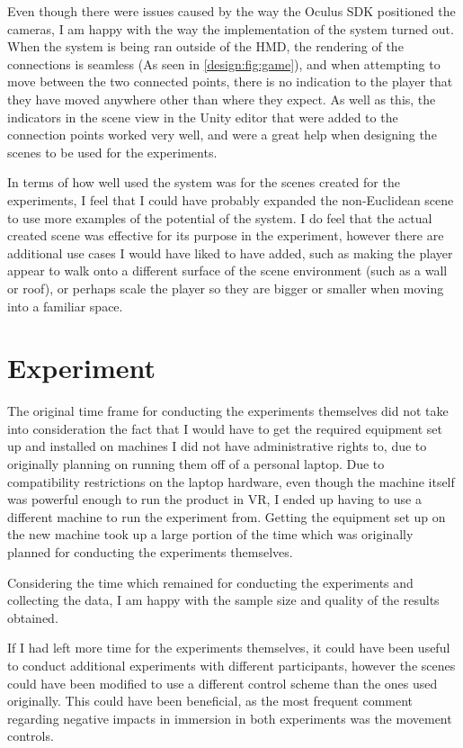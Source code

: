 		Even though there were issues caused by the way the Oculus SDK positioned the cameras, I am happy with the way the implementation of the system turned out.
		When the system is being ran outside of the HMD, the rendering of the connections is seamless (As seen in \autoref{design:fig:game}), and when attempting to move between the two connected points, there is no indication to the player that they have moved anywhere other than where they expect.
		As well as this, the indicators in the scene view in the Unity editor that were added to the connection points worked very well, and were a great help when designing the scenes to be used for the experiments.

		In terms of how well used the system was for the scenes created for the experiments, I feel that I could have probably expanded the non-Euclidean scene to use more examples of the potential of the system.
		I do feel that the actual created scene was effective for its purpose in the experiment, however there are additional use cases I would have liked to have added, such as making the player appear to walk onto a different surface of the scene environment (such as a wall or roof), or perhaps scale the player so they are bigger or smaller when moving into a familiar space. %

	\section{Experiment}

		The original time frame for conducting the experiments themselves did not take into consideration the fact that I would have to get the required equipment set up and installed on machines I did not have administrative rights to, due to originally planning on running them off of a personal laptop.
		Due to compatibility restrictions on the laptop hardware, even though the machine itself was powerful enough to run the product in VR, I ended up having to use a different machine to run the experiment from.
		Getting the equipment set up on the new machine took up a large portion of the time which was originally planned for conducting the experiments themselves.
		
		Considering the time which remained for conducting the experiments and collecting the data, I am happy with the sample size and quality of the results obtained.

		If I had left more time for the experiments themselves, it could have been useful to conduct additional experiments with different participants, however the scenes could have been modified to use a different control scheme than the ones used originally.
		This could have been beneficial, as the most frequent comment regarding negative impacts in immersion in both experiments was the movement controls.


